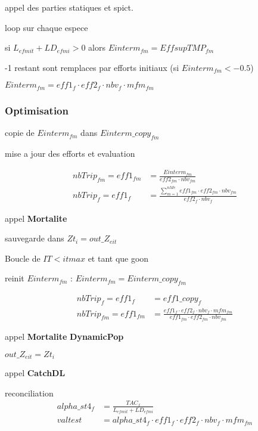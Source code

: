 \documentclass[12pt, colorinlistoftodos]{article}
\begin{document}
appel des parties statiques et spict.

loop sur chaque espece

si $L_{efmit} + LD_{efmi} > 0$ alors $Einterm_{fm} = EffsupTMP_{fm}$

-1 restant sont remplaces par efforts initiaux (si $Einterm_{fm} < -0.5$)

$Einterm_{fm} = eff1_f \cdot eff2_f \cdot nbv_f \cdot mfm_{fm}$


\subsubsection{Optimisation}

copie de $Einterm_{fm}$ dans $Einterm\_copy_{fm}$

mise a jour des efforts et evaluation

\begin{align}
    nbTrip_{fm} = eff1_{fm} &= \frac{Einterm_{fm}}{eff2_{fm} \cdot nbv_{fm}}  \\
    nbTrip_{f} = eff1_{f} &= \frac{\sum_{m=1}^{nMe} eff1_{fm} \cdot eff2_{fm} \cdot nbv_{fm}}{eff2_f \cdot nbv_f} 
\end{align}

appel \textbf{Mortalite}

sauvegarde dans $Zt_i = out\_Z_{eit}$


Boucle de $IT < itmax$ et tant que goon

reinit $Einterm_{fm}$ : $Einterm_{fm} = Einterm\_copy_{fm}$

\begin{align}
    nbTrip_{f} = eff1_{f} &= eff1\_copy_{f} \\
    nbTrip_{fm} = eff1_{fm} &= \frac{ eff1_{f} \cdot eff2_{f} \cdot nbv_{f} \cdot mfm_{fm}}{ eff1_{fm} \cdot eff2_{fm} \cdot nbv_{fm}}
\end{align}

appel \textbf{Mortalite} \textbf{DynamicPop}

$out\_Z_{eit} = Zt_i$

appel \textbf{CatchDL}

reconciliation
\begin{align}
    alpha\_st4_f &= \frac{TAC_f}{L_{efmit} + LD_{efmi}} \\
    valtest &= alpha\_st4_f \cdot eff1_{f} \cdot eff2_{f} \cdot nbv_{f} \cdot mfm_{fm}
\end{align}
\end{document}
